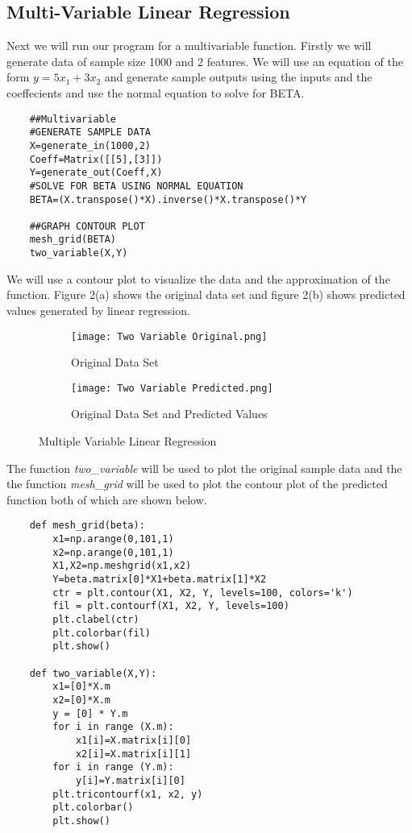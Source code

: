 \subsection{Multi-Variable Linear Regression}
Next we will run our program for a multivariable function. Firstly we will generate data of sample size 1000 and 2 features.
We will use an equation of the form $y=5x_1+3x_2$ and generate sample outputs using the inputs and the coeffecients and use the normal equation to solve for BETA.
\begin{lstlisting}
    ##Multivariable
    #GENERATE SAMPLE DATA
    X=generate_in(1000,2)
    Coeff=Matrix([[5],[3]])
    Y=generate_out(Coeff,X)
    #SOLVE FOR BETA USING NORMAL EQUATION
    BETA=(X.transpose()*X).inverse()*X.transpose()*Y
    
    ##GRAPH CONTOUR PLOT
    mesh_grid(BETA)
    two_variable(X,Y)
\end{lstlisting}
We will use a contour plot to visualize the data and the approximation of the function. Figure 2(a) shows the original data set and figure 2(b) shows predicted values generated by linear regression.
\begin{figure}[H]
    \centering
    \begin{subfigure}{0.5\textwidth}
        \centering
        \texttt{[image: Two Variable Original.png]}
        \caption{Original Data Set}
    \end{subfigure}%
    \begin{subfigure}{0.5\textwidth}
        \centering
        \texttt{[image: Two Variable Predicted.png]}
        \caption{Original Data Set and Predicted Values} 
    \end{subfigure}
    \caption{Multiple Variable Linear Regression}
\end{figure} 

\noindent The function \textit{two\_variable} will be used to plot the original sample data and the the function \textit{mesh\_grid} will be used to plot the contour plot of the predicted function both of which are shown below.
\begin{lstlisting}
    def mesh_grid(beta):
        x1=np.arange(0,101,1)
        x2=np.arange(0,101,1)
        X1,X2=np.meshgrid(x1,x2)
        Y=beta.matrix[0]*X1+beta.matrix[1]*X2
        ctr = plt.contour(X1, X2, Y, levels=100, colors='k')
        fil = plt.contourf(X1, X2, Y, levels=100)
        plt.clabel(ctr)
        plt.colorbar(fil)
        plt.show()

    def two_variable(X,Y):
        x1=[0]*X.m
        x2=[0]*X.m
        y = [0] * Y.m
        for i in range (X.m):
            x1[i]=X.matrix[i][0]
            x2[i]=X.matrix[i][1]
        for i in range (Y.m):
            y[i]=Y.matrix[i][0]
        plt.tricontourf(x1, x2, y)
        plt.colorbar()
        plt.show()
\end{lstlisting}